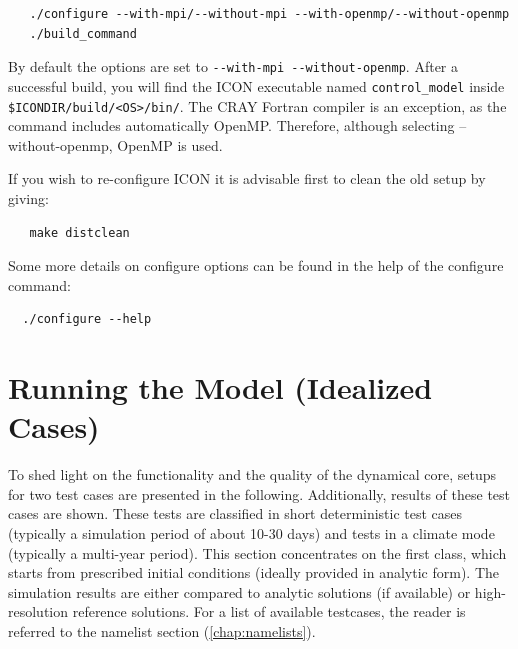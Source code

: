 \begin{small}
  \begin{verbatim}
   ./configure --with-mpi/--without-mpi --with-openmp/--without-openmp
   ./build_command
  \end{verbatim}
\end{small}

By default the options are set to \verb+--with-mpi --without-openmp+. After a successful build, you will find the ICON executable named \verb+control_model+ inside \verb+$ICONDIR/build/<OS>/bin/+. The CRAY Fortran compiler is an exception, as the command includes automatically OpenMP. Therefore, although selecting --without-openmp, OpenMP is used.

If you wish to re-configure ICON it is advisable first to clean the old setup by giving:

\begin{small}
  \begin{verbatim}
   make distclean  
  \end{verbatim}
\end{small}

Some more details on configure options can be found in the help of the configure command:

\begin{small}
 \begin{verbatim}
  ./configure --help
 \end{verbatim}
\end{small}



\section{Running the Model (Idealized Cases)}
\label{chap:UG_running_model_idealized}

To shed light on the functionality and the quality of the dynamical core, setups for two test cases are presented in the following. Additionally, results of these test cases are shown. These tests are classified in short deterministic test cases (typically a simulation period of about 10-30 days) and tests in a climate mode (typically a multi-year period). This section concentrates on the first class, which starts from prescribed initial conditions (ideally provided in analytic form). The simulation results are either compared to analytic solutions (if available) or high-resolution reference solutions. For a list of available testcases, the reader is referred to the namelist section (\ref{chap:namelists}).


